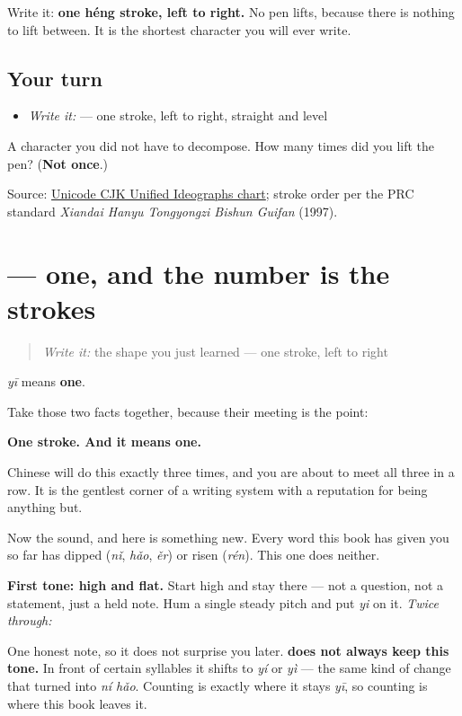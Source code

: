 Write it: \textbf{one héng stroke, left to right.} No pen lifts, because there is nothing to lift between. It is the shortest character you will ever write.

\subsection*{Your turn}
\begin{itemize}
\raggedright
  \item \emph{Write it:}  — one stroke, left to right, straight and level
\end{itemize}

\begin{tcolorbox}[breakable,colback=teal!4,colframe=teal!35!black,title={Before you move on}]
A character you did not have to decompose. How many times did you lift the pen? (\textbf{Not once}.)

Source: \href{https://www.unicode.org/charts/PDF/U4E00.pdf}{Unicode CJK Unified Ideographs chart}; stroke order per the PRC standard \emph{Xiandai Hanyu Tongyongzi Bishun Guifan} (1997).
\end{tcolorbox}
\section[\texorpdfstring{\zh{一} (yī)}{一 (yī)}]{ — one, and the number is the strokes}

\label{lesson:ZH-C03-yi}



\begin{quote}
\emph{Write it:} the shape you just learned — one stroke, left to right
\end{quote}

\begin{sounds}
\textbf{} \emph{yī} means \textbf{one}.

Take those two facts together, because their meeting is the point:

\textbf{One stroke. And it means one.}

Chinese will do this exactly three times, and you are about to meet all three in a row. It is the gentlest corner of a writing system with a reputation for being anything but.

Now the sound, and here is something new. Every word this book has given you so far has dipped (\emph{nǐ}, \emph{hǎo}, \emph{ěr}) or risen (\emph{rén}). This one does neither.

\textbf{First tone: high and flat.} Start high and stay there — not a question, not a statement, just a held note. Hum a single steady pitch and put \emph{yi} on it. \emph{Twice through:}

One honest note, so it does not surprise you later. \textbf{ does not always keep this tone.} In front of certain syllables it shifts to \emph{yí} or \emph{yì} — the same kind of change that turned  into \emph{ní hǎo}. Counting is exactly where it stays \emph{yī}, so counting is where this book leaves it.
\end{sounds}

